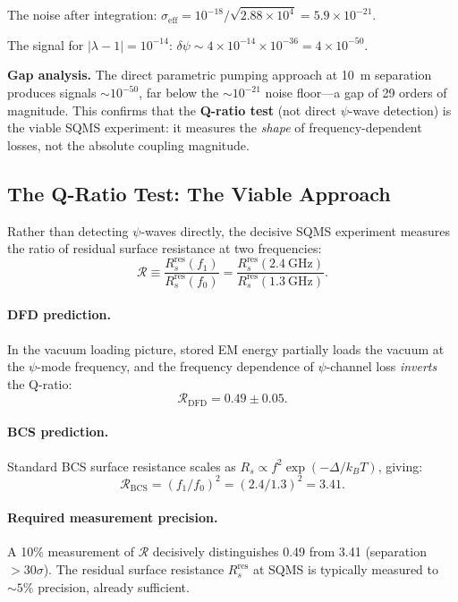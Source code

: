 \documentclass[11pt]{article}
\newcommand{\ee}[1]{\times 10^{#1}}
\newcommand{\lbone}{|\lambda - 1|}
\newcommand{\dpsi}{\delta\psi}
\begin{document}
The noise after integration:
$\sigma_{\text{eff}} = 10^{-18}/\sqrt{2.88\ee{4}} = 5.9\ee{-21}$.

The signal for $\lbone = 10^{-14}$:
$\dpsi \sim 4 \times 10^{-14}\ee{-36} = 4\ee{-50}$.

\textbf{Gap analysis.}  The direct parametric pumping approach at
10~m separation produces signals $\sim 10^{-50}$, far below the
$\sim 10^{-21}$ noise floor---a gap of 29 orders of magnitude.  This
confirms that the \textbf{Q-ratio test} (not direct $\psi$-wave
detection) is the viable SQMS experiment: it measures the
\textit{shape} of frequency-dependent losses, not the absolute
coupling magnitude.

\subsection{The Q-Ratio Test: The Viable Approach}

Rather than detecting $\psi$-waves directly, the decisive SQMS
experiment measures the ratio of residual surface resistance at two
frequencies:
\begin{equation}
\mathcal{R} \equiv
\frac{R_s^{\text{res}}(f_1)}{R_s^{\text{res}}(f_0)}
= \frac{R_s^{\text{res}}(2.4~\text{GHz})}{R_s^{\text{res}}(1.3~\text{GHz})}.
\end{equation}

\paragraph{DFD prediction.}
In the vacuum loading picture, stored EM energy partially loads the
vacuum at the $\psi$-mode frequency, and the frequency dependence of
$\psi$-channel loss \textit{inverts} the Q-ratio:
\begin{equation}
\mathcal{R}_{\text{DFD}} = 0.49 \pm 0.05.
\end{equation}

\paragraph{BCS prediction.}
Standard BCS surface resistance scales as $R_s \propto f^2
\exp(-\Delta/k_BT)$, giving:
\begin{equation}
\mathcal{R}_{\text{BCS}} = (f_1/f_0)^2 = (2.4/1.3)^2 = 3.41.
\end{equation}

\paragraph{Required measurement precision.}
A 10\% measurement of $\mathcal{R}$ decisively distinguishes
0.49 from 3.41 (separation $> 30\sigma$).  The residual surface
resistance $R_s^{\text{res}}$ at SQMS is typically measured to
$\sim 5\%$ precision, already sufficient.
\end{document}
